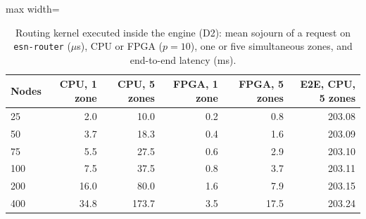 \begin{table}[htbp]
\centering
\caption{Routing kernel executed inside the engine (D2): mean sojourn of a request on \texttt{esn-router} ($\mu$s), CPU or FPGA ($p=10$), one or five simultaneous zones, and end-to-end latency (ms).}
\label{tab:kernel}
\begin{adjustbox}{max width=\textwidth}
\begin{tabular}{lrrrrr}
\toprule
Nodes & CPU, 1 zone & CPU, 5 zones & FPGA, 1 zone & FPGA, 5 zones & E2E, CPU, 5 zones \\
\midrule
25 & 2.0 & 10.0 & 0.2 & 0.8 & 203.08 \\
50 & 3.7 & 18.3 & 0.4 & 1.6 & 203.09 \\
75 & 5.5 & 27.5 & 0.6 & 2.9 & 203.10 \\
100 & 7.5 & 37.5 & 0.8 & 3.7 & 203.11 \\
200 & 16.0 & 80.0 & 1.6 & 7.9 & 203.15 \\
400 & 34.8 & 173.7 & 3.5 & 17.5 & 203.24 \\
\bottomrule
\end{tabular}
\end{adjustbox}
\end{table}
